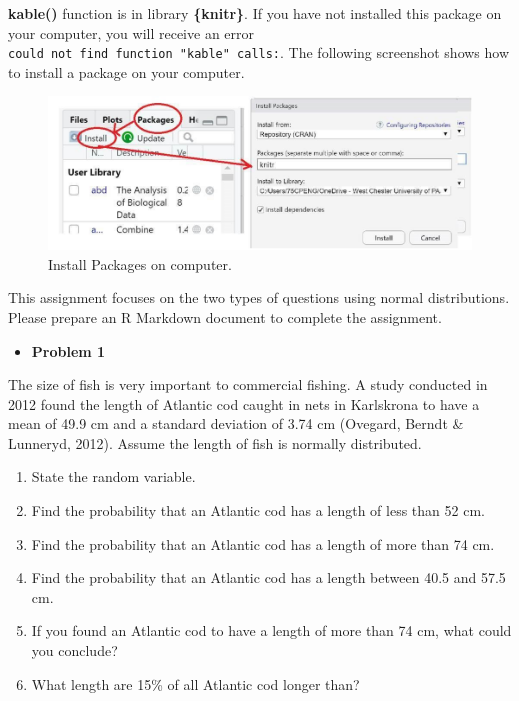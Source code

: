 \documentclass[
]{book}
\providecommand{\tightlist}{%
  \setlength{\itemsep}{0pt}\setlength{\parskip}{0pt}}
\begin{document}
\textbf{kable()} function is in library \textbf{\{knitr\}}. If you have not installed this package on your computer, you will receive an error \texttt{could\ not\ find\ function\ "kable"\ calls:}. The following screenshot shows how to install a package on your computer.

\begin{figure}

{\centering \includegraphics[width=0.8\linewidth]{img04/w04-install-pack} 

}

\caption{Install Packages on computer.}\label{fig:unnamed-chunk-77}
\end{figure}

This assignment focuses on the two types of questions using normal distributions. Please prepare an R Markdown document to complete the assignment.

\begin{itemize}
\tightlist
\item
  \textbf{Problem 1}
\end{itemize}

The size of fish is very important to commercial fishing. A study conducted in 2012 found the length of Atlantic cod caught in nets in Karlskrona to have a mean of 49.9 cm and a standard deviation of 3.74 cm (Ovegard, Berndt \& Lunneryd, 2012). Assume the length of fish is normally distributed.

\begin{enumerate}
\def\labelenumi{\arabic{enumi}.}
\tightlist
\item
  State the random variable.
\item
  Find the probability that an Atlantic cod has a length of less than 52 cm.
\item
  Find the probability that an Atlantic cod has a length of more than 74 cm.
\item
  Find the probability that an Atlantic cod has a length between 40.5 and 57.5 cm.
\item
  If you found an Atlantic cod to have a length of more than 74 cm, what could you conclude?
\item
  What length are 15\% of all Atlantic cod longer than?
\end{enumerate}
\end{document}
